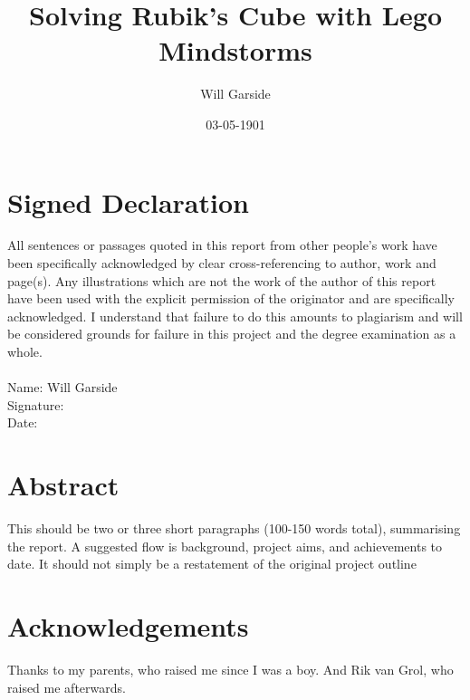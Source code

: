 \documentclass{report}
\title{Solving Rubik's Cube with Lego Mindstorms}
\date{03-05-1901}
\author{Will Garside}
\begin{document}
		
	\maketitle
	\newpage
	
	\section*{Signed Declaration}
	All sentences or passages quoted in this report from other people's work have been specifically acknowledged by clear cross-referencing to author, work and page(s). Any illustrations which are not the work of the author of this report have been used with the explicit permission of the originator and are specifically acknowledged. I understand that failure to do this amounts to plagiarism and will be considered grounds for failure in this project and the degree examination as a whole.
	\\
	\\Name: Will Garside
	\\Signature:
	\\Date: 

	\newpage
	\section*{Abstract}
	This should be two or three short paragraphs (100-150 words total), summarising the report. A suggested flow is background, project aims, and achievements to date. It should not simply be a restatement of the original project outline
	
	\newpage
	\section*{Acknowledgements}
	Thanks to my parents, who raised me since I was a boy. And Rik van Grol, who raised me afterwards.
	
	\newpage
\end{document}
